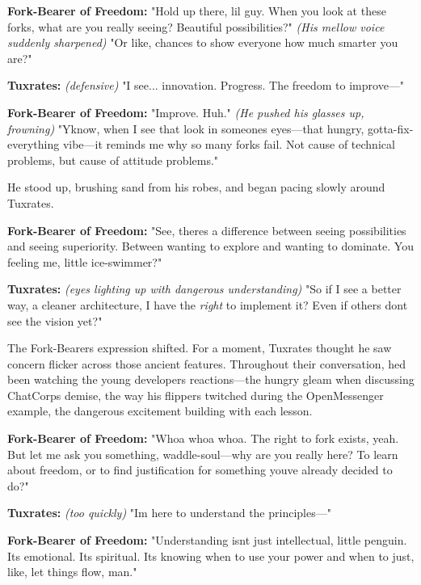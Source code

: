 \textbf{Fork-Bearer of Freedom:} "Hold up there, lil\textquotesingle{} guy. When you look at these forks, what are you really seeing? Beautiful possibilities?" \emph{(His mellow voice suddenly sharpened)} "Or like, chances to show everyone how much smarter you are?"

\textbf{Tuxrates:} \emph{(defensive)} "I see... innovation. Progress. The freedom to improve---"

\textbf{Fork-Bearer of Freedom:} "\textquotesingle Improve.\textquotesingle{} Huh." \emph{(He pushed his glasses up, frowning)} "Y\textquotesingle know, when I see that look in someone\textquotesingle s eyes---that hungry, gotta-fix-everything vibe---it reminds me why so many forks fail. Not \textquotesingle cause of technical problems, but \textquotesingle cause of attitude problems."

He stood up, brushing sand from his robes, and began pacing slowly around Tuxrates.

\textbf{Fork-Bearer of Freedom:} "See, there\textquotesingle s a difference between seeing possibilities and seeing superiority. Between wanting to explore and wanting to dominate. You feeling me, little ice-swimmer?"

\textbf{Tuxrates:} \emph{(eyes lighting up with dangerous understanding)} "So if I see a better way, a cleaner architecture, I have the \emph{right} to implement it? Even if others don\textquotesingle t see the vision yet?"

The Fork-Bearer\textquotesingle s expression shifted. For a moment, Tuxrates thought he saw concern flicker across those ancient features. Throughout their conversation, he\textquotesingle d been watching the young developer\textquotesingle s reactions---the hungry gleam when discussing ChatCorp\textquotesingle s demise, the way his flippers twitched during the OpenMessenger example, the dangerous excitement building with each lesson.

\textbf{Fork-Bearer of Freedom:} "Whoa whoa whoa. The right to fork exists, yeah. But let me ask you something, waddle-soul---why are you really here? To learn about freedom, or to find justification for something you\textquotesingle ve already decided to do?"

\textbf{Tuxrates:} \emph{(too quickly)} "I\textquotesingle m here to understand the principles---"

\textbf{Fork-Bearer of Freedom:} "Understanding isn\textquotesingle t just intellectual, little penguin. It\textquotesingle s emotional. It\textquotesingle s spiritual. It\textquotesingle s knowing when to use your power and when to just, like, let things flow, man."

